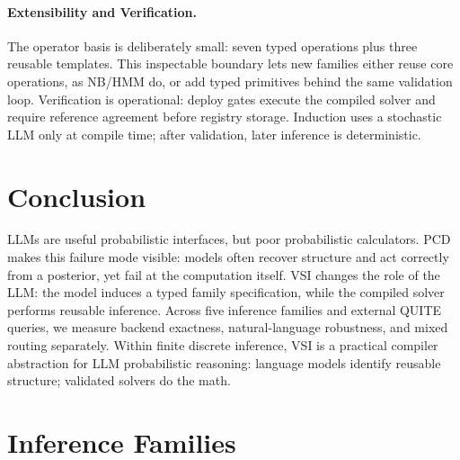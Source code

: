 \documentclass{article}
\newcommand{\method}{VSI}
\begin{document}
\paragraph{Extensibility and Verification.}
The operator basis is deliberately small: seven typed operations plus three reusable templates.
This inspectable boundary lets new families either reuse core operations, as NB/HMM do, or add typed primitives behind the same validation loop.
Verification is operational: deploy gates execute the compiled solver and require reference agreement before registry storage.
Induction uses a stochastic LLM only at compile time; after validation, later inference is deterministic.

\section{Conclusion}
\label{sec:conclusion}

LLMs are useful probabilistic interfaces, but poor probabilistic calculators.
PCD makes this failure mode visible: models often recover structure and act correctly from a posterior, yet fail at the computation itself.
\method{} changes the role of the LLM: the model induces a typed family specification, while the compiled solver performs reusable inference.
Across five inference families and external QUITE queries, we measure backend exactness, natural-language robustness, and mixed routing separately.
Within finite discrete inference, \method{} is a practical compiler abstraction for LLM probabilistic reasoning: language models identify reusable structure; validated solvers do the math.

{\small


}

\appendix

\section{Inference Families}
\label{app:families}
\end{document}

